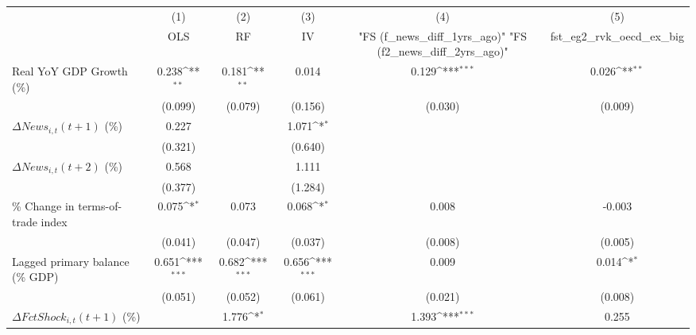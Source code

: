 {
\def\sym#1{\ifmmode^{#1}\else\(^{#1}\)\fi}
\begin{tabular}{l*{5}{c}}
\toprule
                    &\multicolumn{1}{c}{(1)}&\multicolumn{1}{c}{(2)}&\multicolumn{1}{c}{(3)}&\multicolumn{1}{c}{(4)}&\multicolumn{1}{c}{(5)}\\
                    &\multicolumn{1}{c}{OLS}&\multicolumn{1}{c}{RF}&\multicolumn{1}{c}{IV}&\multicolumn{1}{c}{ "FS (f_news_diff_1yrs_ago)"  "FS (f2_news_diff_2yrs_ago)" }&\multicolumn{1}{c}{fst_eg2_rvk_oecd_ex_big}\\
\midrule
Real YoY GDP Growth (\%)&       0.238\sym{**} &       0.181\sym{**} &       0.014         &       0.129\sym{***}&       0.026\sym{**} \\
                    &     (0.099)         &     (0.079)         &     (0.156)         &     (0.030)         &     (0.009)         \\
\addlinespace
$ \Delta News_{i,t}(t+1)$ (\%)&       0.227         &                     &       1.071\sym{*}  &                     &                     \\
                    &     (0.321)         &                     &     (0.640)         &                     &                     \\
\addlinespace
$ \Delta News_{i,t}(t+2)$ (\%)&       0.568         &                     &       1.111         &                     &                     \\
                    &     (0.377)         &                     &     (1.284)         &                     &                     \\
\addlinespace
\% Change in terms-of-trade index&       0.075\sym{*}  &       0.073         &       0.068\sym{*}  &       0.008         &      -0.003         \\
                    &     (0.041)         &     (0.047)         &     (0.037)         &     (0.008)         &     (0.005)         \\
\addlinespace
Lagged primary balance (\% GDP)&       0.651\sym{***}&       0.682\sym{***}&       0.656\sym{***}&       0.009         &       0.014\sym{*}  \\
                    &     (0.051)         &     (0.052)         &     (0.061)         &     (0.021)         &     (0.008)         \\
\addlinespace
$ \Delta FctShock_{i,t}(t+1)$ (\%)&                     &       1.776\sym{*}  &                     &       1.393\sym{***}&       0.255         \\

\end{tabular}}

